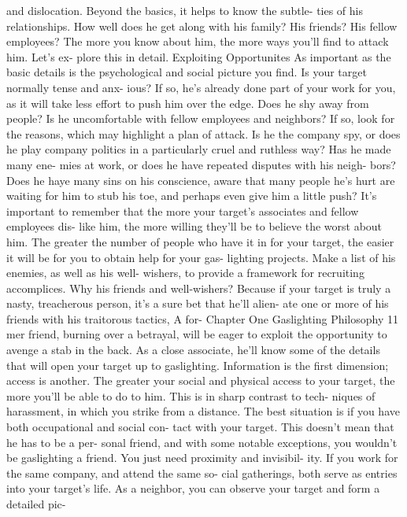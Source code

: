 \documentclass{book}
\begin{document}
and dislocation. Beyond the basics, it helps to know the subtle- 
ties of his relationships. How well does he get along with his 
family? His friends? His fellow employees? The more you know 
about him, the more ways you'll find to attack him. Let's ex- 
plore this in detail. 
Exploiting Opportunites 
As important as the basic details is the psychological and 
social picture you find. Is your target normally tense and anx- 
ious? If so, he's already done part of your work for you, as it 
will take less effort to push him over the edge. 
Does he shy away from people? Is he uncomfortable with 
fellow employees and neighbors? If so, look for the reasons, 
which may highlight a plan of attack. 
Is he the company spy, or does he play company politics in 
a particularly cruel and ruthless way? Has he made many ene- 
mies at work, or does he have repeated disputes with his neigh- 
bors? Does he haye many sins on his conscience, aware that 
many people he's hurt are waiting for him to stub his toe, and 
perhaps even give him a little push? It's important to remember 
that the more your target's associates and fellow employees dis- 
like him, the more willing they'll be to believe the worst about 
him. 
The greater the number of people who have it in for your 
target, the easier it will be for you to obtain help for your gas- 
lighting projects. Make a list of his enemies, as well as his well- 
wishers, to provide a framework for recruiting accomplices. 
Why his friends and well-wishers? Because if your target is 
truly a nasty, treacherous person, it's a sure bet that he'll alien- 
ate one or more of his friends with his traitorous tactics, A for- 
Chapter One 
Gaslighting Philosophy 
11 
mer friend, burning over a betrayal, will be eager to exploit the 
opportunity to avenge a stab in the back. As a close associate, 
he'll know some of the details that will open your target up to 
gaslighting. 
Information is the first dimension; access is another. The 
greater your social and physical access to your target, the more 
you'll be able to do to him. This is in sharp contrast to tech- 
niques of harassment, in which you strike from a distance. The 
best situation is if you have both occupational and social con- 
tact with your target. This doesn't mean that he has to be a per- 
sonal friend, and with some notable exceptions, you wouldn't 
be gaslighting a friend. You just need proximity and invisibil- 
ity. If you work for the same company, and attend the same so- 
cial gatherings, both serve as entries into your target's life. As a 
neighbor, you can observe your target and form a detailed pic- 
\end{document}
